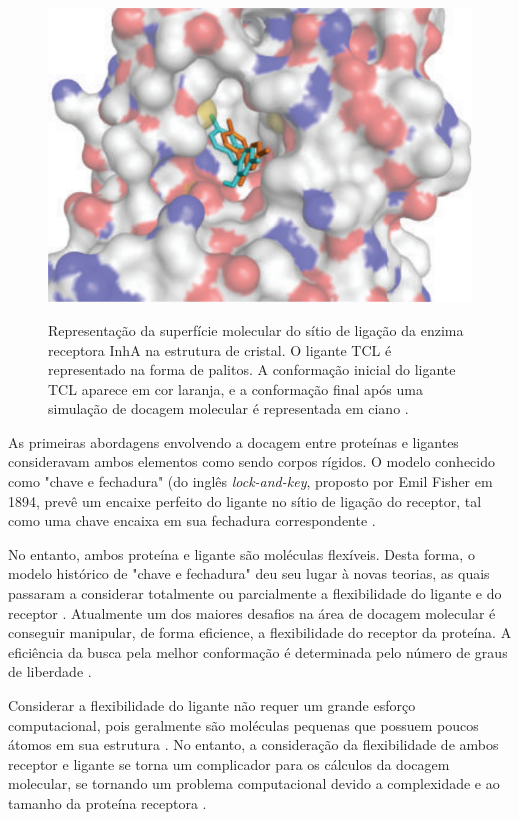 \begin{figure}[h]
	\center
	\includegraphics[scale=0.65]{images/TCLdocking.png}
	\label{fig:tcldock}
	\caption{Representação da superfície molecular do sítio de ligação da enzima receptora InhA na estrutura de cristal. O ligante TCL é  representado na forma de palitos. A conformação inicial do ligante TCL aparece em cor laranja, e a conformação final após uma simulação de docagem molecular é representada em ciano \cite{REN13}.}
\end{figure}

As primeiras abordagens envolvendo a docagem entre proteínas e ligantes consideravam ambos elementos como sendo corpos rígidos. O modelo conhecido como "chave e fechadura" (do inglês \emph{lock-and-key}, proposto por Emil Fisher em 1894, prevê um encaixe perfeito do ligante no sítio de ligação do receptor, tal como uma chave encaixa em sua fechadura correspondente \cite{kar07}. 

No entanto, ambos proteína e ligante são moléculas flexíveis. Desta forma, o modelo histórico de "chave e fechadura" deu seu lugar à novas teorias, as quais passaram a considerar totalmente ou parcialmente a flexibilidade do ligante e do receptor \cite{SOU06}. Atualmente um dos maiores desafios na área de docagem molecular é conseguir manipular, de forma eficience, a flexibilidade do receptor da proteína. A eficiência da busca pela melhor conformação é determinada pelo número de graus de liberdade  \cite{SOU06}. 

Considerar a flexibilidade do ligante não requer um grande esforço computacional, pois geralmente são moléculas pequenas que possuem poucos átomos em sua estrutura \cite{COH10}. No entanto, a consideração da flexibilidade de ambos receptor e ligante se torna um complicador para os cálculos da docagem molecular, se tornando um problema computacional devido a complexidade e ao tamanho da proteína receptora \cite{art08}.

